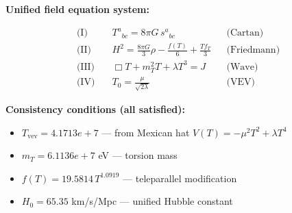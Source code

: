 
\textbf{Unified field equation system:}

\begin{align}
  \text{(I)} \quad & T^a{}_{bc} = 8\pi G \, s^a{}_{bc} && \text{(Cartan)} \\
  \text{(II)} \quad & H^2 = \frac{8\pi G}{3}\rho - \frac{f(T)}{6} + \frac{Tf_T}{3} && \text{(Friedmann)} \\
  \text{(III)} \quad & \Box T + m_T^2 T + \lambda T^3 = J && \text{(Wave)} \\
  \text{(IV)} \quad & T_0 = \frac{\mu}{\sqrt{2\lambda}} && \text{(VEV)}
\end{align}

\textbf{Consistency conditions (all satisfied):}
\begin{itemize}
  \item $T_{\text{vev}} = 4.1713e+7$ — from Mexican hat $V(T) = -\mu^2 T^2 + \lambda T^4$
  \item $m_T = 6.1136e+7$ eV — torsion mass
  \item $f(T) = 19.5814 \, T^{1.0919}$ — teleparallel modification
  \item $H_0 = 65.35$ km/s/Mpc — unified Hubble constant
\end{itemize}